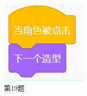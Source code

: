 \documentclass[10pt, a4paper]{article}
\begin{document}
\begin{enumerate}
\begin{figure}[htbp]
\begin{minipage}[t]{.2\textwidth}
\begin{minipage}[t]{.48\textwidth}
                    \includegraphics[width=\textwidth]{19-2.png}
                \end{minipage}
                \caption*{第19题}
            \end{minipage}
            \begin{minipage}[t]{.09\textwidth}
                \centering

\end{minipage}
\end{figure}
\end{enumerate}
\end{document}
